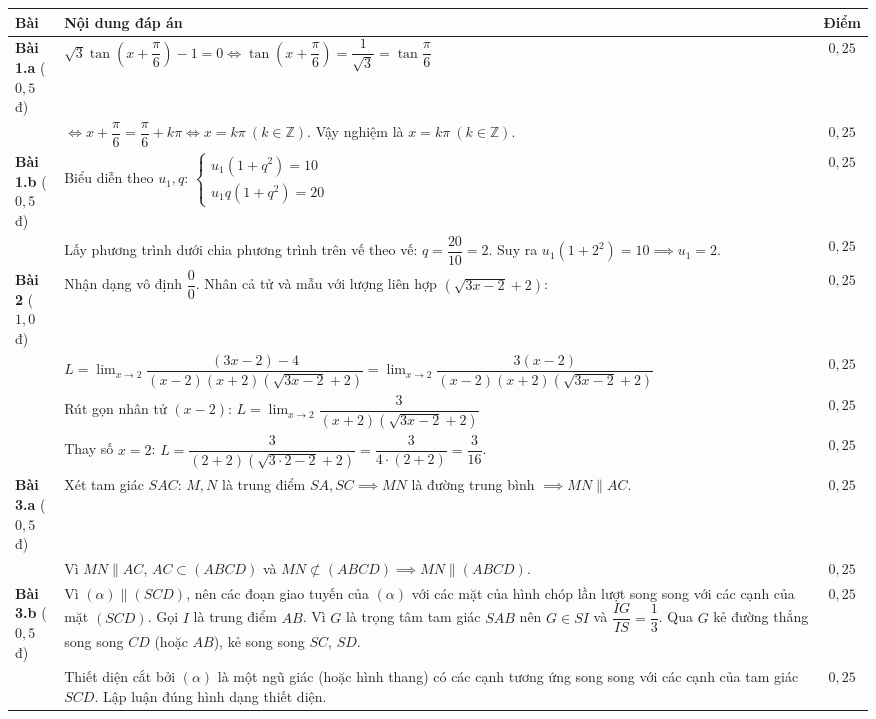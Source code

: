 \documentclass[12pt, a4paper]{article}
\begin{document}
\begin{center}
\renewcommand{\arraystretch}{1.25}
\begin{tabularx}{\textwidth}{|p{1.8cm}|X|c|}
    \hline
    \textbf{Bài} & \textbf{Nội dung đáp án} & \textbf{Điểm} \\ \hline
    \textbf{Bài 1.a} ($0{,}5$ đ) & $\sqrt{3}\tan\left(x + \dfrac{\pi}{6}\right) - 1 = 0 \iff \tan\left(x + \dfrac{\pi}{6}\right) = \dfrac{1}{\sqrt{3}} = \tan\dfrac{\pi}{6}$ & $0{,}25$ \\ \cline{2-3}
    & $\iff x + \dfrac{\pi}{6} = \dfrac{\pi}{6} + k\pi \iff x = k\pi \ (k \in \mathbb{Z})$. Vậy nghiệm là $x = k\pi \ (k \in \mathbb{Z})$. & $0{,}25$ \\ \hline
    \textbf{Bài 1.b} ($0{,}5$ đ) & Biểu diễn theo $u_1, q$: $\begin{cases} u_1(1 + q^2) = 10 \\ u_1 q (1 + q^2) = 20 \end{cases}$ & $0{,}25$ \\ \cline{2-3}
    & Lấy phương trình dưới chia phương trình trên vế theo vế: $q = \dfrac{20}{10} = 2$. Suy ra $u_1(1 + 2^2) = 10 \implies u_1 = 2$. & $0{,}25$ \\ \hline
    \textbf{Bài 2} ($1{,}0$ đ) & Nhận dạng vô định $\dfrac{0}{0}$. Nhân cả tử và mẫu với lượng liên hợp $(\sqrt{3x - 2} + 2)$: & $0{,}25$ \\ \cline{2-3}
    & $L = \lim_{x \to 2} \dfrac{(3x - 2) - 4}{(x - 2)(x + 2)(\sqrt{3x - 2} + 2)} = \lim_{x \to 2} \dfrac{3(x - 2)}{(x - 2)(x + 2)(\sqrt{3x - 2} + 2)}$ & $0{,}25$ \\ \cline{2-3}
    & Rút gọn nhân tử $(x - 2)$: $L = \lim_{x \to 2} \dfrac{3}{(x + 2)(\sqrt{3x - 2} + 2)}$ & $0{,}25$ \\ \cline{2-3}
    & Thay số $x = 2$: $L = \dfrac{3}{(2 + 2)(\sqrt{3 \cdot 2 - 2} + 2)} = \dfrac{3}{4 \cdot (2 + 2)} = \dfrac{3}{16}$. & $0{,}25$ \\ \hline
    \textbf{Bài 3.a} ($0{,}5$ đ) & Xét tam giác $SAC$: $M, N$ là trung điểm $SA, SC \implies MN$ là đường trung bình $\implies MN \parallel AC$. & $0{,}25$ \\ \cline{2-3}
    & Vì $MN \parallel AC$, $AC \subset (ABCD)$ và $MN \not\subset (ABCD) \implies MN \parallel (ABCD)$. & $0{,}25$ \\ \hline
    \textbf{Bài 3.b} ($0{,}5$ đ) & Vì $(\alpha) \parallel (SCD)$, nên các đoạn giao tuyến của $(\alpha)$ với các mặt của hình chóp lần lượt song song với các cạnh của mặt $(SCD)$. Gọi $I$ là trung điểm $AB$. Vì $G$ là trọng tâm tam giác $SAB$ nên $G \in SI$ và $\dfrac{IG}{IS} = \dfrac{1}{3}$. Qua $G$ kẻ đường thẳng song song $CD$ (hoặc $AB$), kẻ song song $SC$, $SD$. & $0{,}25$ \\ \cline{2-3}
    & Thiết diện cắt bởi $(\alpha)$ là một ngũ giác (hoặc hình thang) có các cạnh tương ứng song song với các cạnh của tam giác $SCD$. Lập luận đúng hình dạng thiết diện. & $0{,}25$ \\ \hline
\end{tabularx}
\end{center}
\end{document}

